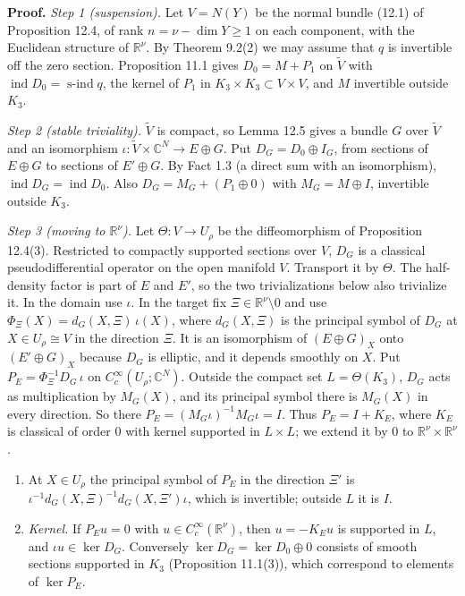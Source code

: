 \documentclass[
  11pt,
]{article}
\begin{document}
\textbf{Proof.} \emph{Step 1 (suspension).} Let \(V=N(Y)\) be the normal
bundle (12.1) of Proposition 12.4, of rank \(n=\nu-\dim Y\ge1\) on each
component, with the Euclidean structure of \(\mathbb R^\nu\). By Theorem
9.2(2) we may assume that \(q\) is invertible off the zero section.
Proposition 11.1 gives \(D_0=M+P_1\) on \(\tilde V\) with
\(\operatorname{ind}D_0=\operatorname{s-ind}q\), the kernel of \(P_1\)
in \(K_3\times K_3\subset V\times V\), and \(M\) invertible outside
\(K_3\).

\emph{Step 2 (stable triviality).} \(\tilde V\) is compact, so Lemma
12.5 gives a bundle \(G\) over \(\tilde V\) and an isomorphism
\(\iota:\tilde V\times\mathbb C^N\to E\oplus G\). Put
\(D_G=D_0\oplus I_G\), from sections of \(E\oplus G\) to sections of
\(E'\oplus G\). By Fact 1.3 (a direct sum with an isomorphism),
\(\operatorname{ind}D_G=\operatorname{ind}D_0\). Also
\(D_G=M_G+(P_1\oplus0)\) with \(M_G=M\oplus I\), invertible outside
\(K_3\).

\emph{Step 3 (moving to \(\mathbb R^\nu\)).} Let \(\Theta:V\to U_\rho\)
be the diffeomorphism of Proposition 12.4(3). Restricted to compactly
supported sections over \(V\), \(D_G\) is a classical pseudodifferential
operator on the open manifold \(V\). Transport it by \(\Theta\). The
half-density factor is part of \(E\) and \(E'\), so the two
trivializations below also trivialize it. In the domain use \(\iota\).
In the target fix \(\Xi\in\mathbb R^\nu\setminus0\) and use
\(\Phi_\Xi(X)=d_G(X,\Xi)\,\iota(X)\), where \(d_G(X,\Xi)\) is the
principal symbol of \(D_G\) at \(X\in U_\rho\cong V\) in the direction
\(\Xi\). It is an isomorphism of \((E\oplus G)_X\) onto
\((E'\oplus G)_X\) because \(D_G\) is elliptic, and it depends smoothly
on \(X\). Put \(P_E=\Phi_\Xi^{-1}D_G\,\iota\) on
\(C_c^\infty(U_\rho;\mathbb C^N)\). Outside the compact set
\(L=\Theta(K_3)\), \(D_G\) acts as multiplication by \(M_G(X)\), and its
principal symbol there is \(M_G(X)\) in every direction. So there
\(P_E=(M_G\iota)^{-1}M_G\iota=I\). Thus \(P_E=I+K_E\), where \(K_E\) is
classical of order \(0\) with kernel supported in \(L\times L\); we
extend it by \(0\) to \(\mathbb R^\nu\times\mathbb R^\nu\).

\begin{enumerate}
\def\labelenumi{(\arabic{enumi})}
\item
  At \(X\in U_\rho\) the principal symbol of \(P_E\) in the direction
  \(\Xi'\) is \(\iota^{-1}d_G(X,\Xi)^{-1}d_G(X,\Xi')\iota\), which is
  invertible; outside \(L\) it is \(I\).
\item
  \emph{Kernel.} If \(P_Eu=0\) with \(u\in C_c^\infty(\mathbb R^\nu)\),
  then \(u=-K_Eu\) is supported in \(L\), and \(\iota u\in\ker D_G\).
  Conversely \(\ker D_G=\ker D_0\oplus0\) consists of smooth sections
  supported in \(K_3\) (Proposition 11.1(3)), which correspond to
  elements of \(\ker P_E\).
\end{enumerate}
\end{document}
